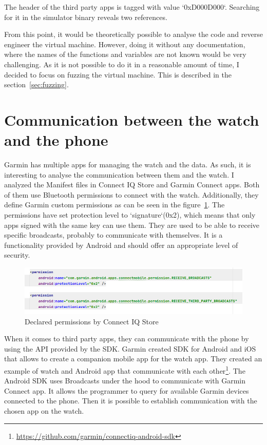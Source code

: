 The header of the third party apps is tagged with value `0xD000D000`\cite{broken-vm}.
Searching for it in the simulator binary reveals two references.

From this point, it would be theoretically possible to analyse the code and reverse engineer the virtual machine.
However, doing it without any documentation, where the names of the functions and variables are not known would be very challenging.
As it is not possible to do it in a reasonable amount of time, I decided to focus on fuzzing the virtual machine.
This is described in the section~\ref{sec:fuzzing}.

\section{Communication between the watch and the phone} \label{subsec:communication-watch-phone}

Garmin has multiple apps for managing the watch and the data.
As such, it is interesting to analyse the communication between them and the watch.
I analyzed the Manifest files in Connect IQ Store and Garmin Connect apps.
Both of them use Bluetooth permissions to connect with the watch.
Additionally, they define Garmin custom permissions as can be seen in the figure~\ref{fig:connect-iq-declared-permissions}.
The permissions have set protection level to `signature`(0x2), which means that only apps signed with the same key can use them.
They are used to be able to receive specific broadcasts, probably to communicate with themselves.
It is a functionality provided by Android and should offer an appropriate level of security.

\begin{figure}[h]
    \centering
    \includegraphics[width=1\linewidth]{../../images/android-declared-permissions}
    \caption{Declared permissions by Connect IQ Store}
    \label{fig:connect-iq-declared-permissions}
\end{figure}

When it comes to third party apps, they can communicate with the phone by using the API provided by the SDK\@.
Garmin created SDK for Android and iOS that allows to create a companion mobile app for the watch app.
They created an example of watch and Android app that communicate with each other\footnote{\url{https://github.com/garmin/connectiq-android-sdk}}.
The Android SDK uses Broadcasts under the hood to communicate with Garmin Connect app.
It allows the programmer to query for available Garmin devices connected to the phone.
Then it is possible to establish communication with the chosen app on the watch.

